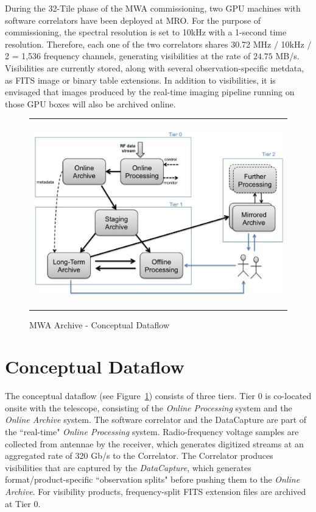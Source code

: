 During the 32-Tile phase of the MWA commissioning, two GPU machines with software correlators have been deployed at MRO. For the purpose of commissioning, the spectral resolution is set to 10kHz with a 1-second time resolution. Therefore, each one of the two correlators shares 30.72 MHz \(/\) 10kHz \(/\) 2 = 1,536 frequency channels, generating visibilities at the rate of \(24.75\) MB/s. Visibilities are currently stored, along with several observation-specific metdata, as FITS image or binary table extensions. In addition to visibilities, it is envisaged that images produced by the real-time imaging pipeline \citep{ord2010interferometric} running on those GPU boxes will also be archived online.

   \begin{figure}
   \begin{center}
   \begin{tabular}{c}
   \includegraphics[height=8cm]{part6/Wu_P34/P34_f1.eps}
   \end{tabular}
   \end{center}
   \caption[]   { \label{fig:con_dataflow} 
MWA Archive - Conceptual Dataflow}
   \end{figure} 

\section{Conceptual Dataflow}
The conceptual dataflow (see Figure~\ref{fig:con_dataflow}) consists of three tiers. Tier 0 is co-located onsite with the telescope, consisting of the \emph{Online Processing} system and the \emph{Online Archive} system. The software correlator and the DataCapture are part of the ``real-time" \emph{Online Processing} system. Radio-frequency voltage samples are collected from antennae by the receiver, which generates digitized streams at an aggregated rate of 320 Gb/s to the Correlator. The Correlator produces visibilities that are captured by the \emph{DataCapture}, which generates format/product-specific ``observation splits" before pushing them to the \emph{Online Archive}. For visibility products, frequency-split FITS extension files are archived at Tier 0.

